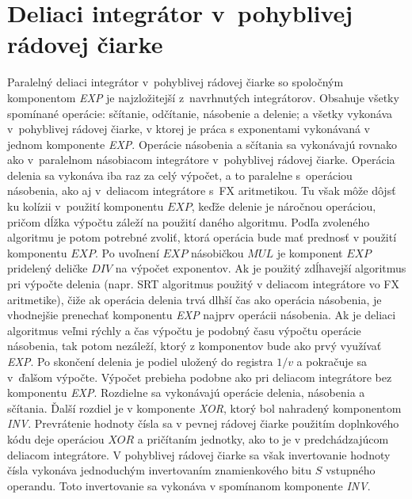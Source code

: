 \section{Deliaci integrátor v~pohyblivej rádovej čiarke}
Paralelný deliaci integrátor v~pohyblivej rádovej čiarke so spoločným komponentom \textit{EXP} je najzložitejší z~navrhnutých integrátorov. Obsahuje všetky spomínané operácie: sčítanie, odčítanie, násobenie a delenie; a všetky vykonáva v~pohyblivej rádovej čiarke, v ktorej je práca s exponentami vykonávaná v jednom komponente \textit{EXP}.
Operácie násobenia a sčítania sa vykonávajú rovnako ako v~paralelnom násobiacom integrátore v~pohyblivej rádovej čiarke. Operácia delenia sa vykonáva iba raz za celý výpočet, a to paralelne s~operáciou násobenia, ako aj v~deliacom integrátore s~FX aritmetikou. Tu však môže dôjsť ku kolízii v~použití komponentu $ EXP $, keďže delenie je náročnou operáciou, pričom dĺžka výpočtu záleží na použití daného algoritmu. Podľa zvoleného algoritmu je potom potrebné zvoliť, ktorá operácia bude mať prednosť v použití komponentu $ EXP $. Po uvoľnení $ EXP $ násobičkou $ MUL $ je komponent $ EXP $ pridelený deličke $ DIV $ na výpočet exponentov. Ak je použitý zdĺhavejší algoritmus pri výpočte delenia (napr. SRT algoritmus použitý v deliacom integrátore vo FX aritmetike), čiže ak operácia delenia trvá dlhší čas ako operácia násobenia, je vhodnejšie prenechať komponentu \textit{EXP} najprv operácii násobenia. Ak je deliaci algoritmus veľmi rýchly a čas výpočtu je podobný času výpočtu operácie násobenia, tak potom nezáleží, ktorý z komponentov bude ako prvý využívať \textit{EXP}. Po skončení delenia je podiel uložený do registra $ 1/v $ a pokračuje sa v~ďalšom výpočte.
Výpočet prebieha podobne ako pri deliacom integrátore bez komponentu \textit{EXP}. Rozdielne sa vykonávajú operácie delenia, násobenia a sčítania. Ďalší rozdiel je v komponente \textit{XOR}, ktorý bol nahradený komponentom \textit{INV}. Prevrátenie hodnoty čísla sa v pevnej rádovej čiarke použitím doplnkového kódu deje operáciou $ XOR $ a pričítaním jednotky, ako to je v predchádzajúcom deliacom integrátore. V pohyblivej rádovej čiarke sa však invertovanie hodnoty čísla vykonáva jednoduchým invertovaním znamienkového bitu $ S $ vstupného operandu. Toto invertovanie sa vykonáva v spomínanom komponente \textit{INV}.

